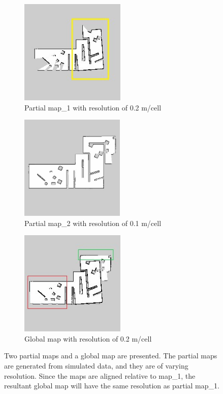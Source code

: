 \begin{figure}[H]
\begin{subfigure}{0.5\textwidth}
\includegraphics[width=0.9\linewidth, height=5cm]{figs/simulation_results/c_diff_resolution/partial_map_1_marked.jpg} 
\caption{Partial map\_1 with resolution of 0.2 m/cell}
\label{fig:sim41}
\end{subfigure}
\begin{subfigure}{0.5\textwidth}
\includegraphics[width=0.9\linewidth, height=5cm]{figs/simulation_results/c_diff_resolution/partial_map_2.jpg} 
\caption{Partial map\_2 with resolution of 0.1 m/cell}
\label{fig:sim42}
\end{subfigure}
\begin{subfigure}{0.5\textwidth}
\centering
\includegraphics[width=0.9\linewidth, height=5cm]{figs/simulation_results/c_diff_resolution/final_map_marked.jpg} 
\caption{Global map with resolution of 0.2 m/cell}
\label{fig:sim43} 
\end{subfigure}
\caption{Two partial maps and a global map are presented. The partial maps are generated from simulated data, and they are of varying resolution. Since the maps are aligned relative to map\_1, the resultant global map will have the same resolution as partial map\_1.}
\label{fig:sim4}
\end{figure}


